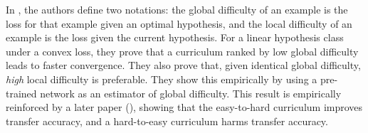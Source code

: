 \documentclass[letterpaper]{article}
\theoremstyle{definition}
\newtheorem{defn}{Definition}[section]
\begin{document}
In \cite{Weinshall2018, Weinshall2020}, the authors define two notations: the global difficulty of an example is the loss for that example given an optimal hypothesis, and the local difficulty of an example is the loss given the current hypothesis.
For a linear hypothesis class under a convex loss, they prove that a curriculum ranked by low global difficulty leads to faster convergence. They also prove that, given identical global difficulty, \emph{high} local difficulty is preferable. They show this empirically by using a pre-trained network as an estimator of global difficulty.
This result is empirically reinforced by a later paper (\cite{Hacohen2019}), showing that the easy-to-hard curriculum improves transfer accuracy, and a hard-to-easy curriculum harms transfer accuracy.



%
\end{document}
